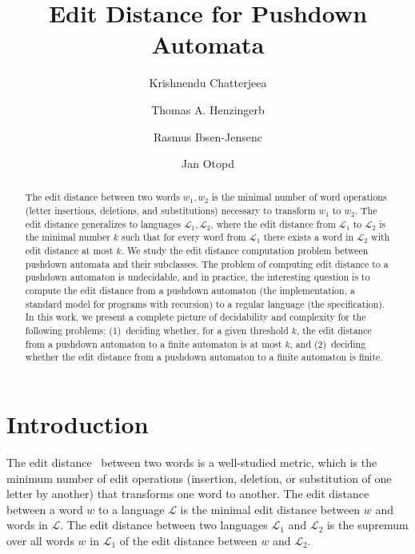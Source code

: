 \documentclass{CSML}
\title[Edit Distance for Pushdown Automata]{Edit Distance for Pushdown Automata}
\author[K.~Chatterjee]{Krishnendu Chatterjee\rsuper a}
\author[T.~A.~Henzinger]{Thomas A. Henzinger\rsuper b}
\author[R.~Ibsen{-}Jensen]{Rasmus Ibsen{-}Jensen\rsuper c}
\author[J.~Otop]{Jan Otop\rsuper d}
\newcommand{\lang}{\mathcal{L}}
\begin{document}
\maketitle

\makeatletter{}\begin{abstract}
The edit distance between two words $w_1, w_2$ is the minimal number of word 
operations (letter insertions, deletions, and substitutions) 
necessary to transform $w_1$ to $w_2$.
The edit distance generalizes to languages $\lang_1, \lang_2$, where 
the edit distance from $\lang_1$ to $\lang_2$ is the minimal number $k$ such that for every word 
from $\lang_1$ there exists a word in $\lang_2$ with edit distance at most $k$.
We study the edit distance computation problem between pushdown automata 
and their subclasses.
The problem of computing edit distance to a pushdown automaton is undecidable,
and in practice, the interesting question is to compute the edit distance 
from a pushdown automaton (the implementation, a standard model for programs with 
recursion) to a regular language (the specification).
In this work, we present a complete picture of decidability and complexity
for the following problems: (1)~deciding whether, for a given threshold $k$, the edit distance from a pushdown automaton to a finite
automaton is at most $k$, and
(2)~deciding whether the edit distance from a pushdown automaton to a finite automaton is finite.
\end{abstract}
 

\section{Introduction}
\makeatletter{}
The edit distance~\cite{levenshtein1966binary} between two words is a well-studied 
metric, which is the minimum number of edit operations (insertion, deletion, 
or substitution of one letter by another) that transforms one word to 
another. 
The edit distance between a word $w$ to a language $\lang$ is the minimal 
edit distance between $w$ and words in $\lang$. 
The edit distance between two languages $\lang_1$ and $\lang_2$ is the supremum over 
all words $w$ in $\lang_1$ of the edit distance between $w$ and $\lang_2$.
\end{document}
